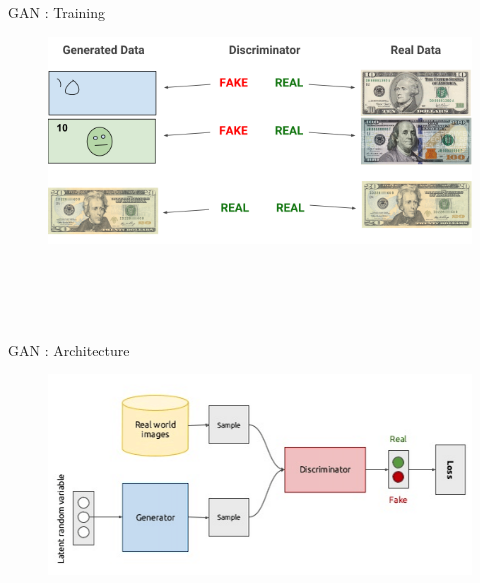 \begin{frame}[fragile]{GAN : Training}
     \begin{figure}[ht]
         \hspace*{-1cm}\includegraphics[width=0.7\linewidth]{gantrain} \\ \\ \\ \\ \\ 


    \end{figure}
\end{frame}

\begin{frame}[fragile]{GAN : Architecture}
     \begin{figure}[ht]
         \hspace*{-1cm}\includegraphics[width=0.7\linewidth]{ganarchitecture.png} \\ \\ \\ \\ \\ 
    \end{figure}
\end{frame}
